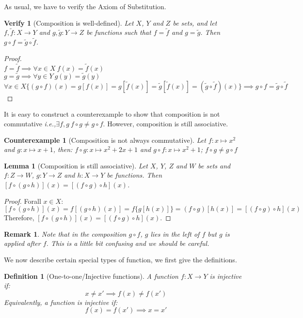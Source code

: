 \documentclass[a4paper]{book}
\newtheorem*{proof}{\textit{Proof.}}
\theoremstyle{break}
\newtheorem{counterexample}{\hspace{-30pt}\protect\dbend\hspace{15pt}Counterexample}[section]
\newtheorem{definition}{Definition}[section]
\newtheorem{lemma}{Lemma}[section]
\newtheorem{remark}{Remark}[section]
\newtheorem*{verify}{Verify}
\begin{document}
			As usual, we have to verify the Axiom of Substitution.
			\begin{verify}[Composition is well-defined]
				Let $X$, $Y$ and $Z$ be sets, and let $f,\tilde{f}:X\to Y$ and $g,\tilde{g}:Y\to Z$ be functions such that $f=\tilde{f}$ and $g=\tilde{g}$. Then $g\circ f=\tilde{g}\circ\tilde{f}$.
			\end{verify}
			\begin{proof}~\\
				$f=\tilde{f}\implies\forall x\in X~f(x)=\tilde{f}(x)$\\
				$g=\tilde{g}\implies\forall y\in Y~g(y)=\tilde{g}(y)$\\
				$\forall x\in X\{(g\circ f)(x)=g[f(x)]=g[\tilde{f}(x)]=\tilde{g}[\tilde{f}(x)]=(\tilde{g}\circ\tilde{f})(x)\}\implies g\circ f=\tilde{g}\circ\tilde{f}$
			\end{proof}
			It is easy to construct a counterexample to show that composition is not commutative \textit{i.e.,}$\exists f,g~f\circ g\neq g\circ f$. However, composition is still associative.
			\begin{counterexample}[Composition is not always commutative]
				Let $f:x\mapsto x^2$ and $g:x\mapsto x+1$, then: $f\circ g:x\mapsto x^2+2x+1$ and $g\circ f:x\mapsto x^2+1$; $f\circ g\neq g\circ f$
			\end{counterexample}
			\begin{lemma}[Composition is still associative]
				Let $X$, $Y$, $Z$ and $W$ be sets and $f:Z\to W$, $g:Y\to Z$ and $h:X\to Y$ be functions. Then $[f\circ(g\circ h)](x)=[(f\circ g)\circ h](x)$.
			\end{lemma}
			\begin{proof}
				Forall $x\in X$:
				$$[f\circ(g\circ h)](x)=f[(g\circ h)(x)]=f\{g[h(x)]\}=(f\circ g)[h(x)]=[(f\circ g)\circ h](x)$$
				Therefore, $[f\circ(g\circ h)](x)=[(f\circ g)\circ h](x)$.
			\end{proof}
			\begin{remark}
				Note that in the composition $g\circ f$, $g$ lies in the left of $f$ but $g$ is applied after $f$. This is a little bit confusing and we should be careful.
			\end{remark}
			We now describe certain special types of function, we first give the definitions.
			\begin{definition}[One-to-one/Injective functions]
				A function $f:X\to Y$ is injective if:
				$$x\neq x'\implies f(x)\neq f(x')$$
				Equivalently, a function is injective if:
				$$f(x)=f(x')\implies x=x'$$
			\end{definition}
\end{document}
